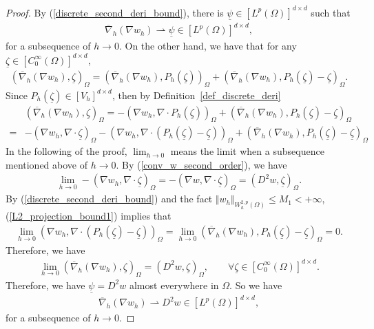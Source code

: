 \documentclass[12pt]{amsart}
\theoremstyle{definition}
\theoremstyle{remark}
\begin{document}
\begin{proof}
By (\ref{discrete_second_deri_bound}), there is $\underline{\psi} \in [L^{p}(\Omega)]^{d \times d}$ such that 
\begin{align*}
\overline{\nabla}_{h}(\nabla w_{h}) \rightharpoonup \underline{\psi} \in [L^{p}(\Omega)]^{d \times d},
\end{align*} 
for a subsequence of $h \rightarrow 0$.
On the other hand, we have that for any $\underline{\zeta} \in [C_{0}^{\infty}(\Omega)]^{d\times d}$,
\begin{align*}
(\overline{\nabla}_{h}(\nabla w_{h}), \underline{\zeta})_{\Omega} 
= (\overline{\nabla}_{h}(\nabla w_{h}), P_{h}(\underline{\zeta}))_{\Omega} 
+ (\overline{\nabla}_{h}(\nabla w_{h}), P_{h}(\underline{\zeta}) - \underline{\zeta})_{\Omega}.
\end{align*}
Since $P_{h}(\underline{\zeta}) \in [V_{h}]^{d \times d}$, then by Definition~\ref{def_discrete_deri}  
\begin{align*}
& (\overline{\nabla}_{h}(\nabla w_{h}), \underline{\zeta})_{\Omega} 
= -(\nabla w_{h}, \nabla \cdot P_{h}(\underline{\zeta}))_{\Omega} 
+ (\overline{\nabla}_{h}(\nabla w_{h}), P_{h}(\underline{\zeta}) - \underline{\zeta})_{\Omega} \\
= &  -(\nabla w_{h}, \nabla \cdot \underline{\zeta})_{\Omega} 
-  (\nabla w_{h}, \nabla \cdot (P_{h}(\underline{\zeta}) -  \underline{\zeta}))_{\Omega} 
+ (\overline{\nabla}_{h}(\nabla w_{h}), P_{h}(\underline{\zeta}) - \underline{\zeta})_{\Omega}
\end{align*} 
In the following of the proof, $\lim_{h\rightarrow 0}$ means the limit 
when a subsequence mentioned above of $h \rightarrow 0$.
By (\ref{conv_w_second_order}), we have 
\begin{align*}
\lim_{h \rightarrow 0} -(\nabla w_{h}, \nabla \cdot \underline{\zeta})_{\Omega} 
= -(\nabla w, \nabla\cdot \underline{\zeta})_{\Omega} 
= (D^{2}w, \underline{\zeta})_{\Omega}.
\end{align*}
By (\ref{discrete_second_deri_bound}) and the fact $\Vert w_{h} \Vert_{W_{h}^{2,p}(\Omega)} \leq M_{1}
< + \infty$, (\ref{L2_projection_bound1}) implies that 
\begin{align*}
\lim_{h\rightarrow 0} (\nabla w_{h}, \nabla \cdot (P_{h}(\underline{\zeta}) -  \underline{\zeta}))_{\Omega}  
= \lim_{h \rightarrow 0} (\overline{\nabla}_{h}(\nabla w_{h}), P_{h}(\underline{\zeta}) - \underline{\zeta})_{\Omega} = 0.
\end{align*}
Therefore, we have 
\begin{align*}
\lim_{h \rightarrow 0} (\overline{\nabla}_{h}(\nabla w_{h}), \underline{\zeta})_{\Omega} = 
(D^{2}w, \underline{\zeta})_{\Omega}, \qquad \forall \underline{\zeta} \in [C_{0}^{\infty}(\Omega)]^{d \times d}. 
\end{align*}
Therefore, we have $\underline{\psi} = D^{2}w$ almost everywhere in $\Omega$. So we have 
\begin{align}
\label{conv_w_second_order_weak} 
\overline{\nabla}_{h}(\nabla w_{h}) \rightharpoonup D^{2}w \in [L^{p}(\Omega)]^{d \times d},
\end{align}
for a subsequence of $h \rightarrow 0$.


\end{proof}
\end{document}
